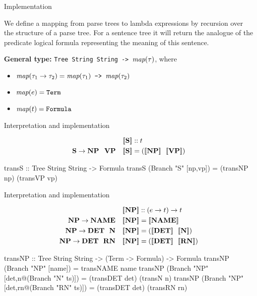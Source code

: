 \documentclass[xcolor=dvipsnames]{beamer}
\newcommand{\sem}[1]{\ensuremath{[\hspace{-1.8pt}[ #1 ]\hspace{-1.8pt}]}}
\begin{document}
\begin{frame}{Implementation}

We define a mapping from parse trees to lambda expressions by recursion over 
the structure of a parse tree. For a sentence tree it will return the analogue 
of the predicate logical formula representing the meaning of this sentence. 

\vspace{.4cm}

{\bf General type:} {\tt Tree String String -> }$\text{\em map}(\tau)$, where
\begin{itemize}
\item $\text{\em map}(\tau_1\to\tau_2)=\text{\em map}(\tau_1)\text{\tt\ ->\ }\text{\em map}(\tau_2)$
\item $\text{\em map}(e)=\text{\tt Term}$
\item $\text{\em map}(t)=\text{\tt Formula}$
\end{itemize}
\end{frame}

\begin{frame}[fragile]{Interpretation and implementation}

\begin{align*}
&\quad \sem{\textbf{S}} :: t \\
\textbf{S} \to \textbf{NP\ \ VP} &\quad \sem{\textbf{S}} = (\sem{\textbf{NP}}\ \ \sem{\textbf{VP}}) \\
\end{align*}

\begin{code}
transS :: Tree String String -> Formula
transS (Branch "S" [np,vp]) = (transNP np) (transVP vp)
\end{code}
\end{frame}

\begin{frame}[fragile]{Interpretation and implementation}

\begin{align*}
&\quad \sem{\textbf{NP}} :: (e\to t)\to t \\
\textbf{NP} \to \textbf{NAME} &\quad \sem{\textbf{NP}} = \sem{\textbf{NAME}} \\
\textbf{NP} \to \textbf{DET}\ \ \textbf{N} &\quad \sem{\textbf{NP}} = (\sem{\textbf{DET}}\ \ \sem{\textbf{N}}) \\
\textbf{NP} \to \textbf{DET}\ \ \textbf{RN} &\quad \sem{\textbf{NP}} = (\sem{\textbf{DET}}\ \ \sem{\textbf{RN}})
\end{align*}

\begin{code}
transNP :: Tree String String -> (Term -> Formula) -> Formula 
transNP (Branch "NP" [name])   = transNAME name 
transNP (Branch "NP" [det,n@(Branch "N" ts)])   = 
                                 (transDET det) (transN n)
transNP (Branch "NP" [det,rn@(Branch "RN" ts)]) = 
                                 (transDET det) (transRN rn)
\end{code}
\end{frame}
\end{document}
